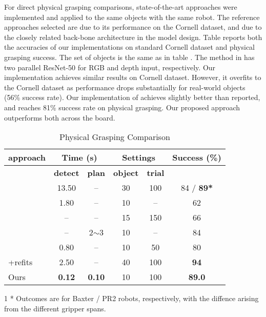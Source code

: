 \documentclass[letterpaper, 10 pt, journal, twoside]{IEEEtran}
\begin{document}
For direct physical grasping comparisons, state-of-the-art 
approaches were 
implemented and applied to the same objects with the same robot. The
reference approaches selected are \cite{GuEtAl_ICRA2017} due to its
performance on the Cornell dataset, and \cite{kumra2016robotic} due to the
closely related back-bone architecture in the model design.
Table  reports both the accuracies of our 
implementations on standard Cornell dataset and physical grasping success.
The set of objects is the same as in table . 
The method in \cite{kumra2016robotic} has two parallel ResNet-50 for RGB and 
depth input, respectively.  Our implementation achieves similar results on
Cornell dataset. However, it overfits to the Cornell dataset as performance
drops substantially for real-world objects (56\% success rate).  Our
implementation of \cite{GuEtAl_ICRA2017} achieves slightly better than
reported, and reaches 81\% success rate on physical grasping. Our proposed
approach outperforms both across the board.


\begin {table}[t]
  \centering
  \caption {Physical Grasping Comparison  }
  \small
  \begin{tabular}{ | l | c | c | c | c | c |}
    \hline
{\bf approach} & \multicolumn{2}{c|}{ \bf{Time} (s)} & \multicolumn{2}{c|}{ \bf{Settings}}   & \bf{Success (\%)}\\ \hline
                                  & \bf{detect} & \bf{plan}  & \bf{object} & \bf{trial} & \\ \hline
    
    \cite{lenz2015deep}        &  13.50&  --    &  30   & 100   &  84 / \bf{89}* \\ \hline
    \cite{watson2017real}      &  1.80 &  --    &  10   & --    &  62     \\ \hline
    \cite{pinto2016supersizing}&  --   &  --    &  15   & 150   &  66     \\ \hline
    \cite{lu2017planning}      &  --   &2$\sim$3&  10   & --    &  84     \\ \hline
    \cite{MaEtAl_RSS[2017]}    &  0.80 &  --    &  10   & 50    &  80     \\ \hline
    \cite{MaEtAl_RSS[2017]}+refits&  2.50 &  -- &  40   & 100   &  \bf{94} \\ \hline \hline
    Ours                       &\bf{0.12}&\bf{0.10}& 10   & 100   &  \bf{89.0}\\

    \hline
  \end{tabular}
        \begin{tablenotes}
        \footnotesize
        \item[1] * Outcomes are for Baxter / PR2 robots, respectively, with the
        diffence arising from the different gripper spans.
\end{tablenotes}
  \vspace*{-0.05in}
\end {table}
\end{document}
